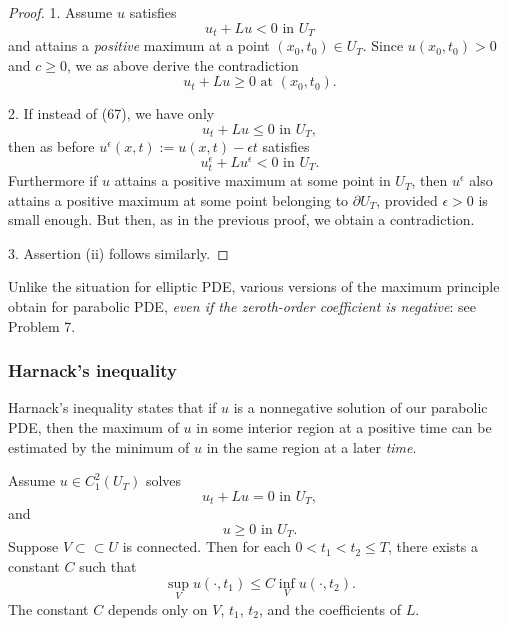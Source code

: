 \begin{proof}
1. Assume $u$ satisfies
\[
u_t + Lu < 0 \text{ in } U_T
\tag{67}
\]
and attains a \textit{positive} maximum at a point $(x_0, t_0) \in U_T$. Since $u(x_0, t_0) > 0$ and $c \geq 0$, we as above derive the contradiction
\[
u_t + Lu \geq 0 \text{ at } (x_0, t_0).
\]

2. If instead of (67), we have only
\[
u_t + Lu \leq 0 \text{ in } U_T,
\]
then as before $u^\epsilon(x,t) := u(x,t) - \epsilon t$ satisfies
\[
u^\epsilon_t + Lu^\epsilon < 0 \text{ in } U_T.
\]
Furthermore if $u$ attains a positive maximum at some point in $U_T$, then $u^\epsilon$ also attains a positive maximum at some point belonging to $\partial U_T$, provided $\epsilon > 0$ is small enough. But then, as in the previous proof, we obtain a contradiction.

3. Assertion (ii) follows similarly.
\end{proof}

\begin{remark}
\label{rem:parabolic-max-principle-negative-c}
Unlike the situation for elliptic PDE, various versions of the maximum principle obtain for parabolic PDE, \textit{even if the zeroth-order coefficient is negative}: see Problem 7.
\end{remark}

\subsubsection{Harnack's inequality}

Harnack's inequality states that if $u$ is a nonnegative solution of our parabolic PDE, then the maximum of $u$ in some interior region at a positive time can be estimated by the minimum of $u$ in the same region at a later \textit{time}.

\begin{theorem}
\label{thm:parabolic-harnack-inequality}
Assume $u \in C^2_1(U_T)$ solves
\[
u_t + Lu = 0 \text{ in } U_T,
\tag{68}
\]
and
\[
u \geq 0 \text{ in } U_T.
\]
Suppose $V \subset\subset U$ is connected. Then for each $0 < t_1 < t_2 \leq T$, there exists a constant $C$ such that
\[
\sup_V u(\cdot, t_1) \leq C \inf_V u(\cdot, t_2).
\tag{69}
\]
The constant $C$ depends only on $V$, $t_1$, $t_2$, and the coefficients of $L$.
\end{theorem}

